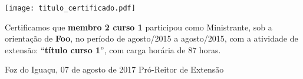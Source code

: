\documentclass[a4paper,brazil]{article}%
\begin{document}
%
\normalsize%

\pagestyle{empty}
\BgThispage
%
\vspace*{2cm}%
\begin{flushright}%
\texttt{[image: titulo\_certificado.pdf]}%
\linebreak%
\end{flushright}%
\vspace*{-1cm}%
\Large%
%


    Certificamos que \textbf{membro 2 curso 1} participou como Ministrante, sob a orientação de \textbf{Foo}, no período de agosto/2015 a agosto/2015, com a atividade de extensão: ``\textbf{título curso 1}'', com carga horária de 87 horas.

\vspace*{1.5cm}%
\hspace*{7cm}%
\begin{minipage}{\widthof{Foz do Iguaçu, 07 de agosto de 2017}}%
\begin{center}%
Foz do Iguaçu, 07 de agosto de 2017%
\newline%
\newline%
\newline%
Pró{-}Reitor de Extensão%
\end{center}%
\end{minipage}%
\end{document}
